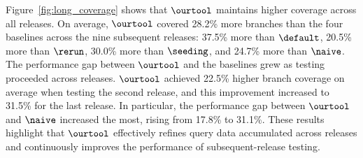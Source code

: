 Figure~\ref{fig:long_coverage} shows that $\ourtool$ maintains higher coverage across all releases. On average, $\ourtool$ covered 28.2\% more branches than the four baselines across the nine subsequent releases: 37.5\% more than $\default$, 20.5\% more than $\rerun$, 30.0\% more than $\seeding$, and 24.7\% more than $\naive$. The performance gap between $\ourtool$ and the baselines grew as testing proceeded across releases. $\ourtool$ achieved 22.5\% higher branch coverage on average when testing the second release, and this improvement increased to 31.5\% for the last release. In particular, the performance gap between $\ourtool$ and $\naive$ increased the most, rising from 17.8\% to 31.1\%. 
These results highlight that $\ourtool$ effectively refines query data accumulated across releases and continuously improves the performance of subsequent-release testing.